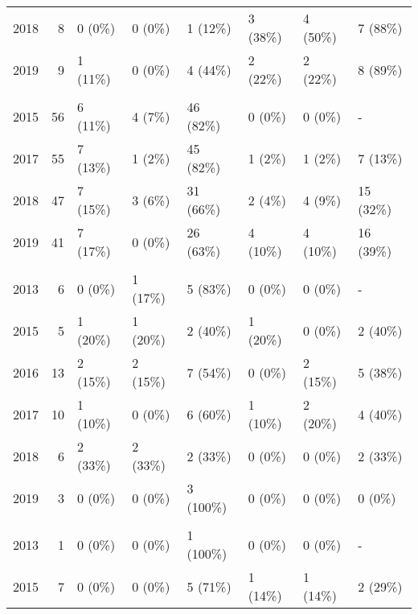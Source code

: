 \begin{appendix}
\begin{longtable}[t]{lrllllll}
\hspace{1em}2018 & 8 & 0 (0\%) & 0 (0\%) & 1 (12\%) & 3 (38\%) & 4 (50\%) & 7 (88\%)\\
\hspace{1em}2019 & 9 & 1 (11\%) & 0 (0\%) & 4 (44\%) & 2 (22\%) & 2 (22\%) & 8 (89\%)\\
\addlinespace[0.3em]
\multicolumn{8}{l}{\textbf{Strack}}\\
\hspace{1em}2015 & 56 & 6 (11\%) & 4 (7\%) & 46 (82\%) & 0 (0\%) & 0 (0\%) & -\\
\hspace{1em}2017 & 55 & 7 (13\%) & 1 (2\%) & 45 (82\%) & 1 (2\%) & 1 (2\%) & 7 (13\%)\\
\hspace{1em}2018 & 47 & 7 (15\%) & 3 (6\%) & 31 (66\%) & 2 (4\%) & 4 (9\%) & 15 (32\%)\\
\hspace{1em}2019 & 41 & 7 (17\%) & 0 (0\%) & 26 (63\%) & 4 (10\%) & 4 (10\%) & 16 (39\%)\\
\addlinespace[0.3em]
\multicolumn{8}{l}{\textbf{Carter}}\\
\hspace{1em}2013 & 6 & 0 (0\%) & 1 (17\%) & 5 (83\%) & 0 (0\%) & 0 (0\%) & -\\
\hspace{1em}2015 & 5 & 1 (20\%) & 1 (20\%) & 2 (40\%) & 1 (20\%) & 0 (0\%) & 2 (40\%)\\
\hspace{1em}2016 & 13 & 2 (15\%) & 2 (15\%) & 7 (54\%) & 0 (0\%) & 2 (15\%) & 5 (38\%)\\
\hspace{1em}2017 & 10 & 1 (10\%) & 0 (0\%) & 6 (60\%) & 1 (10\%) & 2 (20\%) & 4 (40\%)\\
\hspace{1em}2018 & 6 & 2 (33\%) & 2 (33\%) & 2 (33\%) & 0 (0\%) & 0 (0\%) & 2 (33\%)\\
\hspace{1em}2019 & 3 & 0 (0\%) & 0 (0\%) & 3 (100\%) & 0 (0\%) & 0 (0\%) & 0 (0\%)\\
\addlinespace[0.3em]
\multicolumn{8}{l}{\textbf{Caruso}}\\
\hspace{1em}2013 & 1 & 0 (0\%) & 0 (0\%) & 1 (100\%) & 0 (0\%) & 0 (0\%) & -\\
\hspace{1em}2015 & 7 & 0 (0\%) & 0 (0\%) & 5 (71\%) & 1 (14\%) & 1 (14\%) & 2 (29\%)\\

\end{longtable}
\end{appendix}
